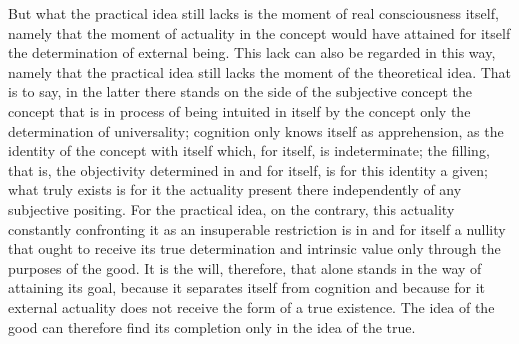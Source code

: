 But what the practical idea still lacks is
the moment of real consciousness itself,
namely that the moment of actuality in the concept
would have attained for itself
the determination of external being.
This lack can also be regarded in this way,
namely that the practical idea still lacks the moment
of the theoretical idea.
That is to say, in the latter there stands
on the side of the subjective concept
the concept that is in process of being intuited
in itself by the concept
only the determination of universality;
cognition only knows itself as apprehension,
as the identity of the concept with itself
which, for itself, is indeterminate;
the filling, that is, the objectivity
determined in and for itself,
is for this identity a given;
what truly exists is for it
the actuality present there independently
of any subjective positing.
For the practical idea, on the contrary,
this actuality constantly confronting it as
an insuperable restriction is in and for itself a nullity
that ought to receive its true determination and intrinsic value
only through the purposes of the good.
It is the will, therefore, that alone stands
in the way of attaining its goal,
because it separates itself from cognition
and because for it external actuality does not
receive the form of a true existence.
The idea of the good can therefore find its completion
only in the idea of the true.

